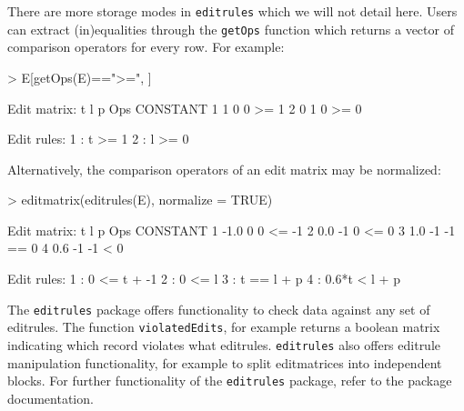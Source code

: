 \documentclass[11pt, fleqn, a4paper]{article}
\begin{document}
There are more storage modes in {\tt editrules} which we will
not detail here. Users can extract
(in)equalities through the {\tt getOps} function which returns a vector of
comparison operators for every row. For example:
\begin{Schunk}
\begin{Sinput}
> E[getOps(E)==">=", ]
\end{Sinput}
\begin{Soutput}
Edit matrix:
  t l p Ops CONSTANT
1 1 0 0  >=        1
2 0 1 0  >=        0

Edit rules:
1 : t >= 1 
2 : l >= 0  
\end{Soutput}
\end{Schunk}
Alternatively, the comparison operators of an edit matrix may be normalized:
\begin{Schunk}
\begin{Sinput}
> editmatrix(editrules(E), normalize = TRUE)
\end{Sinput}
\begin{Soutput}
Edit matrix:
     t  l  p Ops CONSTANT
1 -1.0  0  0  <=       -1
2  0.0 -1  0  <=        0
3  1.0 -1 -1  ==        0
4  0.6 -1 -1   <        0

Edit rules:
1 : 0 <= t + -1 
2 : 0 <= l 
3 : t == l + p 
4 : 0.6*t < l + p  
\end{Soutput}
\end{Schunk}
The {\tt editrules} package offers functionality to check data against any set
of editrules. The function {\tt violatedEdits}, for example returns a boolean
matrix indicating which record violates what editrules. {\tt editrules} also
offers editrule manipulation functionality, for example to split editmatrices
into independent blocks. For further functionality of the {\tt editrules}
package, refer to the package documentation.
\end{document}
